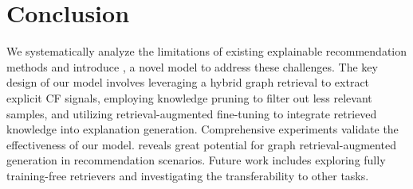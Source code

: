 
\section{Conclusion}

We systematically analyze the limitations of existing explainable recommendation methods and introduce \model, a novel model to address these challenges. The key design of our model involves leveraging a hybrid graph retrieval to extract explicit CF signals, employing knowledge pruning to filter out less relevant samples, and utilizing retrieval-augmented fine-tuning to integrate retrieved knowledge into explanation generation. Comprehensive experiments validate the effectiveness of our model. \model reveals great potential for graph retrieval-augmented generation in recommendation scenarios. Future work includes exploring fully training-free retrievers and investigating the transferability to other tasks.